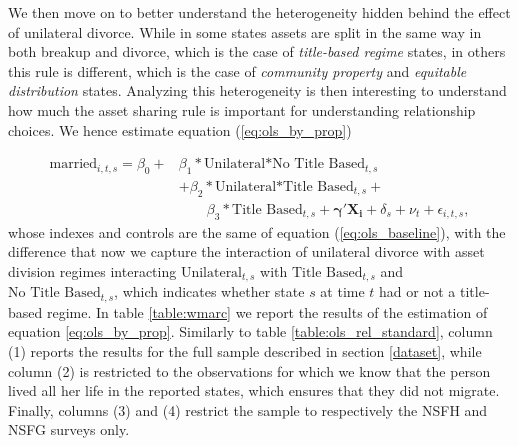 \documentclass[12pt]{article}
\numberwithin{table}{section}
\begin{document}
We then move on to better understand the heterogeneity hidden behind the effect of unilateral divorce. While in some states assets are split in the same way in both breakup and divorce, which is the case of \textit{title-based regime} states, in others this rule is different, which is the case of \textit{community property} and \textit{equitable distribution} states. Analyzing this heterogeneity is then interesting to understand how much the asset sharing rule is important for understanding relationship choices.  We hence estimate equation (\ref{eq:ols_by_prop})


\begin{equation}\label{eq:ols_by_prop}
\begin{split}
\text{married}_{i,t,s}=\beta_0+&\beta_1*\text{Unilateral*No Title Based}_{t,s}\\&+\beta_2*\text{Unilateral*Title Based}_{t,s}+\\&\quad\quad\beta_3*\text{Title Based}_{t,s}+\mathbf{\gamma'}\mathbf{X_i}+\delta_s+\nu_t+\epsilon_{i,t,s},
\end{split}
\end{equation}
whose  indexes and controls are the same of equation (\ref{eq:ols_baseline}), with the difference that now we capture the interaction of unilateral divorce with asset division regimes interacting $\text{Unilateral}_{t,s}$ with  $\text{Title Based}_{t,s}$ and $\text{No Title Based}_{t,s}$, which indicates whether state $s$ at time $t$ had or not a title-based regime. In table \ref{table:wmarc} we report the results of the estimation of equation \ref{eq:ols_by_prop}. Similarly to table \ref{table:ols_rel_standard}, column (1) reports the results for the full sample described in section \ref{dataset}, while column (2) is restricted to the observations for which we know that the person lived all her life in the reported states, which ensures that they did not migrate. Finally, columns (3) and (4) restrict the sample to respectively the NSFH and NSFG surveys only.
\end{document}
